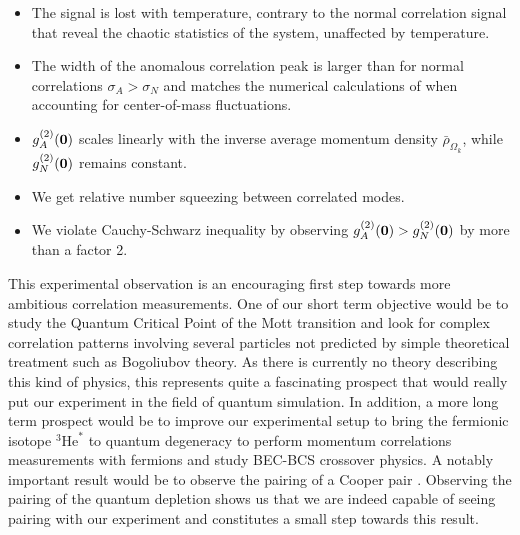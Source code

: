 \begin{itemize}
\begin{itemize}
        \item The signal is lost with temperature, contrary to the normal correlation signal that reveal the chaotic statistics of the system, unaffected by temperature.
        \item The width of the anomalous correlation peak is larger than for normal correlations $\sigma_A > \sigma_N$ and matches the numerical calculations of \cite{butera2020} when accounting for center-of-mass fluctuations.
        \item $g^{(2)}_A(\bm{0})$ scales linearly with the inverse average momentum density $\bar{\rho}_{\Omega_k}$, while $g^{(2)}_N(\bm{0})$ remains constant.
        \item We get relative number squeezing between correlated modes.
        \item We violate Cauchy-Schwarz inequality by observing $g^{(2)}_A(\bm{0}) > g^{(2)}_N(\bm{0})$ by more than a factor 2.
        
    \end{itemize}
\end{itemize}

This experimental observation is an encouraging first step towards more ambitious correlation measurements. One of our short term objective would be to study the Quantum Critical Point of the Mott transition and look for complex correlation patterns involving several particles not predicted by simple theoretical treatment such as Bogoliubov theory. As there is currently no theory describing this kind of physics, this represents quite a fascinating prospect that would really put our experiment in the field of quantum simulation. In addition, a more long term prospect would be to improve our experimental setup to bring the fermionic isotope $^3 \mathrm{He}^*$ to quantum degeneracy to perform momentum correlations measurements with fermions and study BEC-BCS crossover physics. A notably important result would be to observe the \kmk pairing of a Cooper pair \cite{cooper1956bound}. Observing the \kmk pairing of the quantum depletion shows us that we are indeed capable of seeing \kmk pairing with our experiment and constitutes a small step towards this result.


